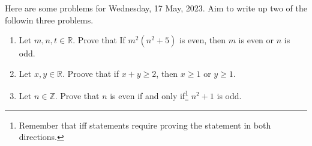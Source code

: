 \documentclass[12pt]{article} %
\begin{document}
\noindent Here are some problems for Wednesday, 17 May, 2023. Aim to
write up two of the followin three problems. 
\bigskip

\begin{enumerate}
\setlength{\itemsep}{20mm} %

\item Let $m, n, t \in \mathbb{R}$. Prove that If $m^2(n^2+5)$ is
  even, then $m$ is even or $n$ is odd.


\item Let $x, y \in \mathbb{R}$. Proove that if $x+y \geq 2$, then $x
  \geq 1$ or $y \geq 1$.

\item Let $n \in \mathbb{Z}$. Prove that $n$ is even if and only
  if\footnote{Remember that iff statements require proving the
    statement in both directions.}
  $n^2+1$ is odd. 


\end{enumerate}
\end{document}
